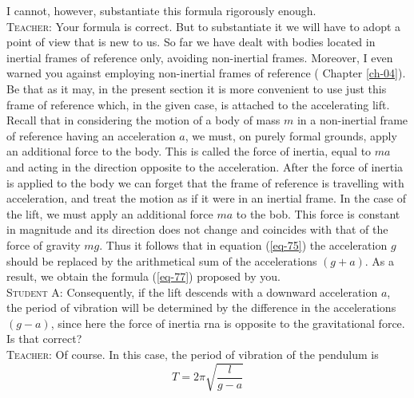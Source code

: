 \documentclass[a4paper,sfsidenotes]{tufte-book}
\begin{document}
I cannot, however, substantiate this formula rigorously enough.
\\
\textsc{Teacher:} Your formula is correct. But to substantiate it we will have to adopt a point of view that is new to us. So far we have dealt with bodies located in inertial frames of reference only, avoiding non-inertial frames. Moreover, I even warned you against employing non-inertial frames of reference
( Chapter \ref{ch-04}). Be that as it may, in the present section it is more convenient to use just this frame of reference which, in the given case, is attached to the accelerating lift. Recall that in considering the motion of a body of mass $m$ in a non-inertial frame of reference having an acceleration $a$, we must, on purely formal grounds, apply an additional force to the body. This is called the force of inertia, equal to $ma$ and acting in the direction opposite to the acceleration. After the force of inertia is applied to the body we can forget that the frame of reference is travelling with acceleration, and treat the motion as if it were in an inertial frame. In the case of the lift, we must apply an additional force $ma$ to the bob. This force is constant in magnitude and its direction does not change and coincides with that of the force of gravity $mg$. Thus it follows that in equation (\ref{eq-75}) the acceleration $g$ should be replaced by the arithmetical sum of the accelerations $(g+a)$. As a result, we obtain the formula (\ref{eq-77}) proposed by you.
\\
\textsc{Student A:} Consequently, if the lift descends with a downward acceleration $a$, the period of vibration will be determined by the difference in the accelerations $(g-a)$, since here the force of inertia rna is opposite to the gravitational force. Is that correct?
\\
\textsc{Teacher:} Of course. In this case, the period of vibration of the pendulum is
\\
\begin{equation}
T = 2 \pi \sqrt{\frac{l}{g-a}}
\label{78}
\end{equation}
\end{document}
